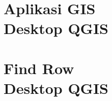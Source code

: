 \documentclass{WileySix}
\begin{document}
\chapter[QGIS]
{Aplikasi GIS\\ Desktop QGIS}


\chapter[findrow]
{Find Row\\ Desktop QGIS}










\printindex
\end{document}
